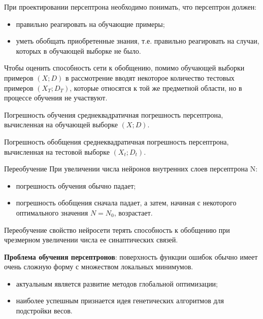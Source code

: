 \documentclass{beamer}
\begin{document}
\linespread{1.0}
\begin{frame}[t]
	При проектировании персептрона необходимо понимать, что персептрон должен:  
	\begin{itemize}
		\item правильно реагировать на обучающие примеры;
		\item уметь обобщать приобретенные знания, т.е. правильно реагировать на  случаи, которых в обучающей выборке не было.
	\end{itemize}	 
	Чтобы оценить способность сети к обобщению, помимо обучающей выборки примеров $(X;D)$ в рассмотрение вводят некоторое количество тестовых примеров $(X_T;D_T)$, которые относятся к той же предметной области, но в процессе обучения не участвуют.	
	\begin{block}{Погрешность обучения}
	среднеквадратичная погрешность персептрона, вычисленная на обучающей выборке $(X;D)$.
	\end{block}
	\begin{block}{Погрешность обобщения}
	среднеквадратичная погрешность персептрона, вычисленная на тестовой выборке $(X_t;D_t)$.
	\end{block}	 
\end{frame}

\begin{frame}[t]{Переобучение}
При увеличении числа нейронов внутренних слоев персептрона N:
	\begin{itemize}
	\item погрешность обучения обычно падает;
	\item погрешность обобщения сначала падает, а затем, начиная с некоторого оптимального значения $N = N_0$, возрастает.
	\end{itemize}
	\begin{block}{Переобучение}
	свойство нейросети терять способность к обобщению при чрезмерном увеличении числа ее синаптических связей.
	\end{block}	
	
	\textbf{Проблема обучения персептронов}: 	поверхность функции ошибок обычно имеет очень сложную форму с множеством локальных минимумов. 
	\begin{itemize}{}
	\item актуальным является развитие методов глобальной оптимизации;
	\item наиболее успешным признается идея генетических алгоритмов для подстройки весов.
	\end{itemize}
\end{frame}
\end{document}
